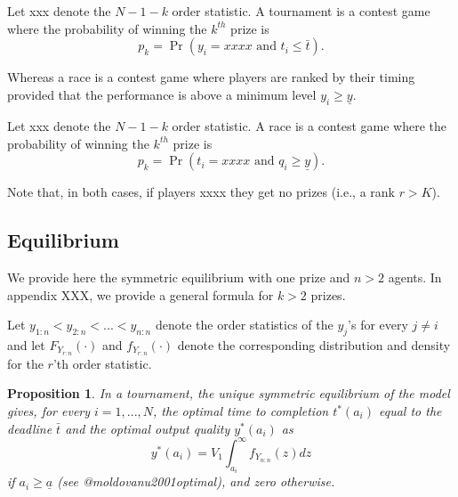 \documentclass[12pt,]{article}
\newtheorem{proposition}{Proposition}
\begin{document}
\begin{definition}
Let xxx denote the $N-1-k$ order statistic. A tournament is a contest game where the probability of winning the $k^{th}$ prize is 
\begin{equation}
  p_{k} = \Pr(y_i=xxxx\text{ and }t_i\leq \bar{t}). 
\end{equation}
\end{definition}

Whereas a race is a contest game where players are ranked by their
timing provided that the performance is above a minimum level
\(y_i\geq \underline y\).

\begin{definition}
Let xxx denote the $N-1-k$ order statistic. A race is a contest game where the probability of winning the $k^{th}$ prize is 
\begin{equation}
  p_{k} = \Pr(t_i=xxxx\text{ and }q_i\geq \underline{y}). 
\end{equation}
\end{definition}

Note that, in both cases, if players xxxx they get no prizes (i.e., a
rank \(r > K\)).

\subsection{Equilibrium}\label{equilibrium}

We provide here the symmetric equilibrium with one prize and \(n>2\)
agents. In appendix XXX, we provide a general formula for \(k>2\)
prizes.

Let \(y_{1:n} < y_{2:n} < ... < y_{n:n}\) denote the order statistics of
the \(y_j\)'s for every \(j\neq i\) and let \({F_{Y_{r:n}}}(\cdot)\) and
\({f_{Y_{r:n}}}(\cdot)\) denote the corresponding distribution and
density for the \(r\)'th order statistic.

\begin{proposition}
In a tournament, the unique symmetric equilibrium of the model gives,
for every $i=1, ..., N$, the optimal time to completion $t^*(a_i)$ equal
to the deadline $\bar{t}$ and the optimal output quality $y^*(a_i)$ as
\begin{equation}
 \label{eq: optimal bid tournament}
  y^*(a_i) =  V_1 \int_{a_i}^\infty {f_{Y_{n:n}}} (z) dz
\end{equation}
if ${a_i}\geq \underline a$ (see @moldovanu2001optimal), and zero otherwise.
\end{proposition}
\end{document}
